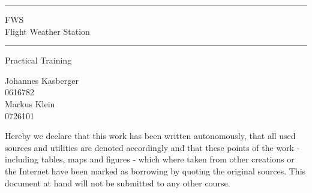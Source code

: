 \documentclass[a4paper,english,12pt,oneside]{memoir}
\newcommand\HRule{\noindent\rule{\linewidth}{1.5pt}}
\begin{document}
\begin{titlingpage}
    \HRule
    \begin{center}
        \LARGE FWS \\ 
        Flight Weather Station
    \end{center}
    \HRule
    \begin{center}
        \Large Practical Training \\
        
     \end{center}
    \begin{center}
        \vspace{30pt}
        \normalsize Johannes Kasberger \\
        0616782 \\
        \vspace{15pt}
        Markus Klein \\
        0726101
     \end{center}
     \newpage
     
\noindent Hereby we declare that this work has been written autonomously, that all used sources and utilities are denoted accordingly and that these points of the work - including tables, maps and figures - which where taken from other creations or the Internet have been marked as borrowing by quoting the original sources. This document at hand will not be submitted to any other course.
\vspace*{30pt}
\noindent

 \end{titlingpage}

\tableofcontents
\newpage
\listoffigures
\listoftables








\end{document}
